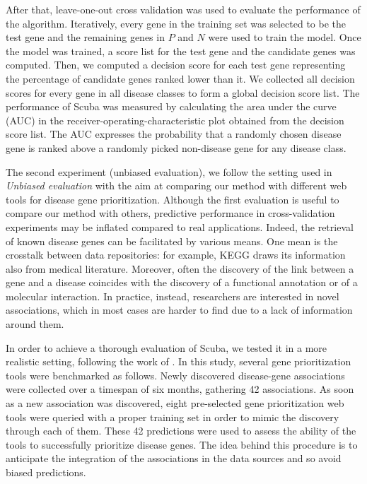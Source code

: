 After that, leave-one-out cross validation was used to evaluate the performance of the algorithm. Iteratively, every gene in the training set was selected to be the test gene and the remaining genes in $P$ and $N$ were used to train the model. Once the model was trained, a score list for the test gene and the candidate genes was computed. Then, we computed a decision score for each test gene representing the percentage of candidate genes ranked lower than it. We collected all decision scores for every gene in all disease classes to form a global decision score list. The performance of Scuba was measured by calculating the area under the curve (AUC) in the receiver-operating-characteristic plot obtained from the decision score list. The AUC expresses the probability that a randomly chosen disease gene is ranked above a randomly picked non-disease gene for any disease class.

The second experiment (unbiased evaluation), we follow the setting used in \textit{Unbiased evaluation} with the aim at comparing our method with different web tools for disease gene prioritization. Although the first evaluation is useful to compare our method with others, predictive performance in cross-validation experiments may be inflated compared to real applications. Indeed, the retrieval of known disease genes can be facilitated by various means. One mean is the crosstalk between data repositories: for example, KEGG \cite{kegg} draws its information also from medical literature. Moreover, often the discovery of the link between a gene and a disease coincides with the discovery of a functional annotation or of a molecular interaction. In practice, instead, researchers are interested in novel associations, which in most cases are harder to find due to a lack of information around them.

In order to achieve a thorough evaluation of Scuba, we tested it in a more realistic setting, following the work of \cite{bornigen}. In this study, several gene prioritization tools were benchmarked as follows. Newly discovered disease-gene associations were collected over a timespan of six months, gathering 42 associations. As soon as a new association was discovered, eight pre-selected gene prioritization web tools were queried with a proper training set in order to mimic the discovery through each of them. These 42 predictions were used to assess the ability of the tools to successfully prioritize disease genes. The idea behind this procedure is to anticipate the integration of the associations in the data sources and so avoid biased predictions.

